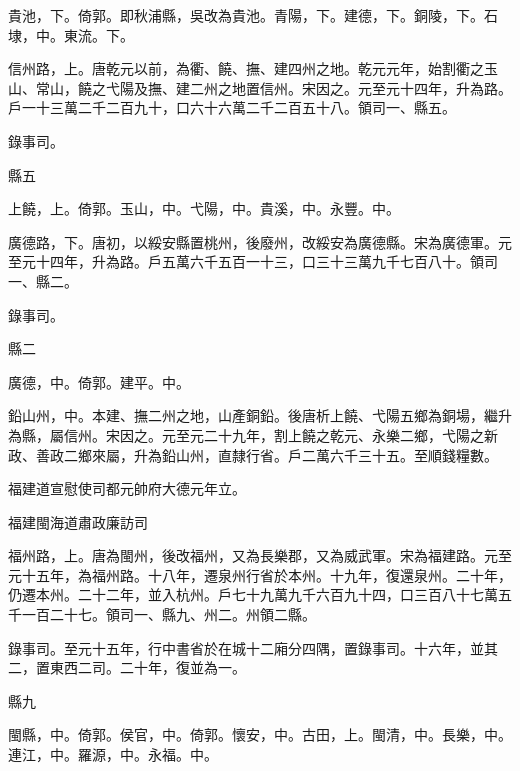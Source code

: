 \begin{pinyinscope}
 貴池，下。倚郭。即秋浦縣，吳改為貴池。青陽，下。建德，下。銅陵，下。石埭，中。東流。下。



 信州路，上。唐乾元以前，為衢、饒、撫、建四州之地。乾元元年，始割衢之玉山、常山，饒之弋陽及撫、建二州之地置信州。宋因之。元至元十四年，升為路。戶一十三萬二千二百九十，口六十六萬二千二百五十八。領司一、縣五。



 錄事司。



 縣五



 上饒，上。倚郭。玉山，中。弋陽，中。貴溪，中。永豐。中。



 廣德路，下。唐初，以綏安縣置桃州，後廢州，改綏安為廣德縣。宋為廣德軍。元至元十四年，升為路。戶五萬六千五百一十三，口三十三萬九千七百八十。領司一、縣二。



 錄事司。



 縣二



 廣德，中。倚郭。建平。中。



 鉛山州，中。本建、撫二州之地，山產銅鉛。後唐析上饒、弋陽五鄉為銅場，繼升為縣，屬信州。宋因之。元至元二十九年，割上饒之乾元、永樂二鄉，弋陽之新政、善政二鄉來屬，升為鉛山州，直隸行省。戶二萬六千三十五。至順錢糧數。



 福建道宣慰使司都元帥府大德元年立。



 福建閩海道肅政廉訪司



 福州路，上。唐為閩州，後改福州，又為長樂郡，又為威武軍。宋為福建路。元至元十五年，為福州路。十八年，遷泉州行省於本州。十九年，復還泉州。二十年，仍遷本州。二十二年，並入杭州。戶七十九萬九千六百九十四，口三百八十七萬五千一百二十七。領司一、縣九、州二。州領二縣。



 錄事司。至元十五年，行中書省於在城十二廂分四隅，置錄事司。十六年，並其二，置東西二司。二十年，復並為一。



 縣九



 閩縣，中。倚郭。侯官，中。倚郭。懷安，中。古田，上。閩清，中。長樂，中。連江，中。羅源，中。永福。中。




\end{pinyinscope}
